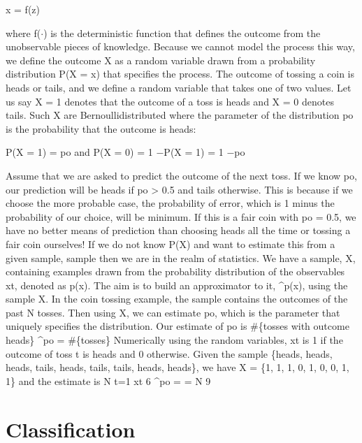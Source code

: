 x = f(z)

where f($\cdot$) is the deterministic function that defines the outcome from the unobservable pieces of knowledge. Because we cannot model the process this way, we define the outcome X as a random variable drawn from a probability distribution P(X = x) that specifies the process. The outcome of tossing a coin is heads or tails, and we define a random variable that takes one of two values. Let us say X = 1 denotes that the outcome of a toss is heads and X = 0 denotes tails. Such X are Bernoullidistributed where the parameter of the distribution po is the probability that the outcome is heads:

P(X = 1) = po and P(X = 0) = 1 $-$P(X = 1) = 1 $-$po

Assume that we are asked to predict the outcome of the next toss. If we know po, our prediction will be heads if po > 0.5 and tails otherwise. This is because if we choose the more probable case, the probability of error, which is 1 minus the probability of our choice, will be minimum. If this is a fair coin with po = 0.5, we have no better means of prediction than choosing heads all the time or tossing a fair coin ourselves! If we do not know P(X) and want to estimate this from a given sample, sample then we are in the realm of statistics. We have a sample, X, containing examples drawn from the probability distribution of the observables xt, denoted as p(x). The aim is to build an approximator to it, \textasciicircum{}p(x), using the sample X. In the coin tossing example, the sample contains the outcomes of the past N tosses. Then using X, we can estimate po, which is the parameter that uniquely specifies the distribution. Our estimate of po is \#\{tosses with outcome heads\} \textasciicircum{}po = \#\{tosses\} Numerically using the random variables, xt is 1 if the outcome of toss t is heads and 0 otherwise. Given the sample \{heads, heads, heads, tails, heads, tails, tails, heads, heads\}, we have X = \{1, 1, 1, 0, 1, 0, 0, 1, 1\} and the estimate is N t=1 xt 6 \textasciicircum{}po = = N 9

\section{Classification}

